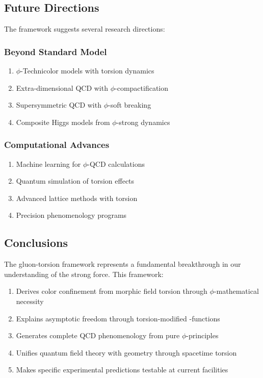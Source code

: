 \subsection{Future Directions}

The framework suggests several research directions:

\subsubsection{Beyond Standard Model}

\begin{enumerate}
\item $\phi$-Technicolor models with torsion dynamics
\item Extra-dimensional QCD with $\phi$-compactification
\item Supersymmetric QCD with $\phi$-soft breaking
\item Composite Higgs models from $\phi$-strong dynamics
\end{enumerate}

\subsubsection{Computational Advances}

\begin{enumerate}
\item Machine learning for $\phi$-QCD calculations
\item Quantum simulation of torsion effects
\item Advanced lattice methods with torsion
\item Precision phenomenology programs
\end{enumerate}

\subsection{Conclusions}

The gluon-torsion framework represents a fundamental breakthrough in our understanding of the strong force. This framework:

\begin{enumerate}
\item Derives color confinement from morphic field torsion through $\phi$-mathematical necessity
\item Explains asymptotic freedom through torsion-modified \beta-functions
\item Generates complete QCD phenomenology from pure $\phi$-principles
\item Unifies quantum field theory with geometry through spacetime torsion
\item Makes specific experimental predictions testable at current facilities
\end{enumerate}

